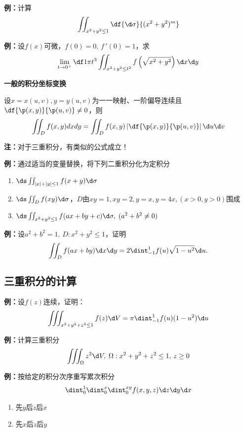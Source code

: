 {\bf 例：}计算
$$\iint_{x^2+y^2\leq 1}\df{\d\sigma}{(x^2+y^2)^m}$$

{\bf 例：}设$f(x)$可微，$f(0)=0,\,f\,'(0)=1$，求
$$\lim\limits_{t\to 0^+}\df 1{\pi t^3}
\iint_{x^2+y^2\leq t^2}f\left(
\sqrt{x^2+y^2}\right)\d x\d y$$

{\bf 一般的积分坐标变换}

设$x=x(u,v),y=y(u,v)$为一一映射、一阶偏导连续且$\df{\p(x,y)}{\p(u,v)}\ne0$，则
$$\iint_Df(x,y)dxdy=\iint_D f(x,y)\left|\df{\p(x,y)}{\p(u,v)}\right|
\d u\d v$$

{\bf 注：}对于三重积分，有类似的公式成立！

{\bf 例：}通过适当的变量替换，将下列二重积分化为定积分 
\begin{enumerate}[(1)]
  \setlength{\itemindent}{1cm}
  \item $\ds\iint_{|x|+|y|\leq 1}f(x+y)\d\sigma$ 
  \item $\ds\iint_Df(xy)\d\sigma$，$D$由$xy=1,xy=2,y=x,y=4x,(x>0,y>0)$围成 
  \item $\ds\iint_{x^2+y^2\leq 1} f(ax+by+c)\d\sigma,\;(a^2+b^2\ne 0)$
\end{enumerate}

{\bf 例：}设$a^2+b^2=1,\, D:x^2+y^2\leq 1$，证明
$$\iint_Df(ax+by)\d x\d y=2\dint_{-1}^1f(u)\sqrt{1-u^2}\d u.$$

\subsection{三重积分的计算}

{\bf 例：}设$f(z)$连续，证明：
$$\iiint_{x^2+y^2+z^2\leq 1}f(z)\d V=\pi\dint_{-1}^1f(u)(1-u^2)\d u$$

{\bf 例：}计算三重积分
$$\iiint_{\Omega}z^2\d V,\;\Omega:x^2+y^2+z^2\leq 1,\,z\geq 0$$

{\bf 例：}按给定的积分次序重写累次积分
$$\dint_0^1\dint_0^x\dint_0^{xy}f(x,y,z)\d z\d y\d x$$
\begin{enumerate}[(1)]
  \setlength{\itemindent}{1cm}
  \item 先$y$后$z$后$x$
  \item 先$x$后$z$后$y$
\end{enumerate}

